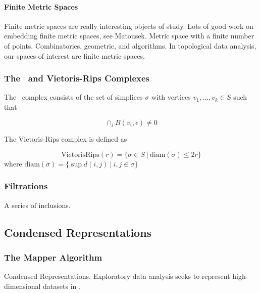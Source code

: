 \paragraph{Finite Metric Spaces}
Finite metric spaces are really interesting objects of study.
Lots of good work on embedding finite metric spaces, see Matousek.
Metric space with a finite number of points.
Combinatorics, geometric, and algorithms.
In topological data analysis, our spaces of interest are finite metric spaces.

\subsubsection{The \Cech\ and Vietoris-Rips Complexes}

The \Cech\ complex consists of the set of simplices $\sigma$ with vertices $v_{1},...,v_{k}\in S$ such that

\begin{equation}
\displaystyle\cap_{i}^{} B(v_{i},\epsilon)\neq0
\end{equation}

The Vietoris-Rips complex is defined as

\begin{equation}
\mathrm{VietorisRips}(r) = \{ \sigma\in S\:|\:\mathrm{diam}(\sigma) \leq 2r \}
\end{equation}
where $\mathrm{diam}(\sigma)=\{ \sup d(i,j) \:|\: i,j\in\sigma \}$

\subsubsection{Filtrations}

A series of inclusions.


\subsection{Condensed Representations}

\subsubsection{The Mapper Algorithm}
\label{subsec:mapper}

Condensed Representations.
Exploratory data analysis seeks to represent high-dimensional datasets in .

